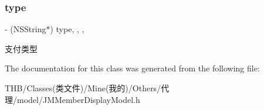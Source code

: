 \subsubsection{\texorpdfstring{type}{type}}
{\footnotesize\ttfamily -\/ (N\+S\+String$\ast$) type\hspace{0.3cm}{\ttfamily [read]}, {\ttfamily [write]}, {\ttfamily [nonatomic]}, {\ttfamily [copy]}}

支付类型 

The documentation for this class was generated from the following file\+:\begin{DoxyCompactItemize}
\item 
T\+H\+B/\+Classes(类文件)/\+Mine(我的)/\+Others/代理/model/J\+M\+Member\+Display\+Model.\+h\end{DoxyCompactItemize}
